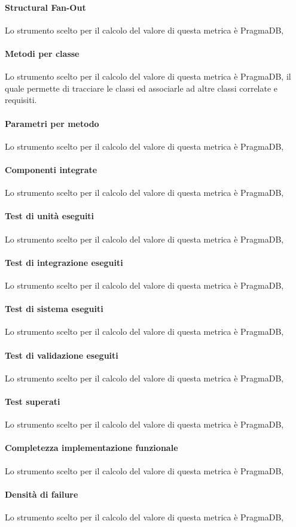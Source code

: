 \paragraph{Structural Fan-Out}
Lo strumento scelto per il calcolo del valore di questa metrica è PragmaDB,
\paragraph{Metodi per classe}
Lo strumento scelto per il calcolo del valore di questa metrica è PragmaDB, il quale permette di tracciare le classi ed associarle ad altre classi correlate e requisiti.
\paragraph{Parametri per metodo}
Lo strumento scelto per il calcolo del valore di questa metrica è PragmaDB,
\paragraph{Componenti integrate}
Lo strumento scelto per il calcolo del valore di questa metrica è PragmaDB,
\paragraph{Test di unità eseguiti}
Lo strumento scelto per il calcolo del valore di questa metrica è PragmaDB,
\paragraph{Test di integrazione eseguiti}
Lo strumento scelto per il calcolo del valore di questa metrica è PragmaDB,
\paragraph{Test di sistema eseguiti}
Lo strumento scelto per il calcolo del valore di questa metrica è PragmaDB,
\paragraph{Test di validazione eseguiti}
Lo strumento scelto per il calcolo del valore di questa metrica è PragmaDB,
\paragraph{Test superati}
Lo strumento scelto per il calcolo del valore di questa metrica è PragmaDB,
\paragraph{Completezza implementazione funzionale}
Lo strumento scelto per il calcolo del valore di questa metrica è PragmaDB,
\paragraph{Densità di failure}
Lo strumento scelto per il calcolo del valore di questa metrica è PragmaDB,

